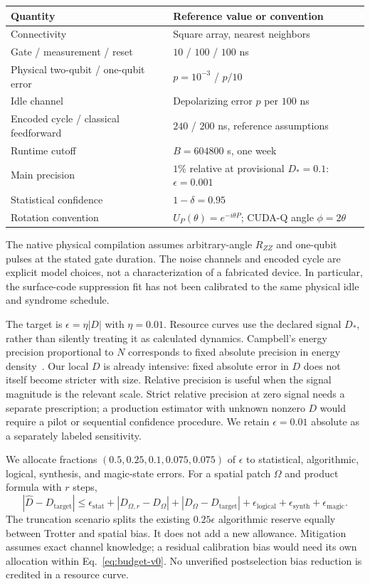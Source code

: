 \documentclass[11pt]{article}
\newcommand{\eps}{\epsilon}
\begin{document}
\begin{center}
\begin{tabular}{ll}
\toprule
Quantity & Reference value or convention\\
\midrule
Connectivity & Square array, nearest neighbors\\
Gate / measurement / reset & $10$ / $100$ / $100$ ns\\
Physical two-qubit / one-qubit error & $p=10^{-3}$ / $p/10$\\
Idle channel & Depolarizing error $p$ per $100$ ns\\
Encoded cycle / classical feedforward & $240$ / $200$ ns, reference assumptions\\
Runtime cutoff & $B=604800$ s, one week\\
Main precision & $1\%$ relative at provisional $D_*=0.1$: $\eps=0.001$\\
Statistical confidence & $1-\delta=0.95$\\
Rotation convention & $U_P(\theta)=e^{-i\theta P}$; CUDA-Q angle $\phi=2\theta$\\
\bottomrule
\end{tabular}
\end{center}
The native physical compilation assumes arbitrary-angle $R_{ZZ}$ and
one-qubit pulses at the stated gate duration. The noise channels and encoded
cycle are explicit model choices, not a characterization of a fabricated
device. In particular, the surface-code suppression fit has not been
calibrated to the same physical idle and syndrome schedule.

The target is $\eps=\eta|D|$ with $\eta=0.01$. Resource curves use the
declared signal $D_*$, rather than silently treating it as calculated dynamics.
Campbell's energy precision proportional to $N$ corresponds to fixed absolute
precision in energy density~\cite{campbell}. Our local $D$ is already
intensive: fixed absolute error in $D$ does not itself become stricter with
size. Relative precision is useful when the signal magnitude is the relevant
scale. Strict relative precision at zero signal needs a separate prescription;
a production estimator with unknown nonzero $D$ would require a pilot or
sequential confidence procedure. We retain $\eps=0.01$ absolute as a
separately labeled sensitivity.

We allocate fractions $(0.5,0.25,0.1,0.075,0.075)$ of $\eps$ to statistical,
algorithmic, logical, synthesis, and magic-state errors. For a spatial patch
$\Omega$ and product formula with $r$ steps,
\begin{equation}\label{eq:budget-v0}
 |\widehat D-D_{\mathrm{target}}|\leq\eps_{\mathrm{stat}}
 +|D_{\Omega,r}-D_\Omega|+|D_\Omega-D_{\mathrm{target}}|
 +\eps_{\mathrm{logical}}+\eps_{\mathrm{synth}}+\eps_{\mathrm{magic}}.
\end{equation}
The truncation scenario splits the existing $0.25\eps$ algorithmic reserve
equally between Trotter and spatial bias. It does not add a new allowance.
Mitigation assumes exact channel knowledge; a residual calibration bias would
need its own allocation within Eq.~\eqref{eq:budget-v0}. No unverified
postselection bias reduction is credited in a resource curve.
\end{document}
